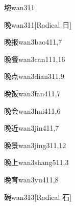 \begin{verbete}{埦}{wan3}{11}
\end{verbete}

\begin{verbete}{晚}{wan3}{11}[Radical 日]
\end{verbete}

\begin{verbete}{晚报}{wan3bao4}{11,7}
\end{verbete}

\begin{verbete}{晚餐}{wan3can1}{11,16}
\end{verbete}

\begin{verbete}{晚点}{wan3dian3}{11,9}
\end{verbete}

\begin{verbete}{晚饭}{wan3fan4}{11,7}
\end{verbete}

\begin{verbete}{晚会}{wan3hui4}{11,6}
\end{verbete}

\begin{verbete}{晚近}{wan3jin4}{11,7}
\end{verbete}

\begin{verbete}{晚景}{wan3jing3}{11,12}
\end{verbete}

\begin{verbete}{晚上}{wan3shang5}{11,3}
\end{verbete}

\begin{verbete}{晚育}{wan3yu4}{11,8}
\end{verbete}

\begin{verbete}{碗}{wan3}{13}[Radical 石]
\end{verbete}

